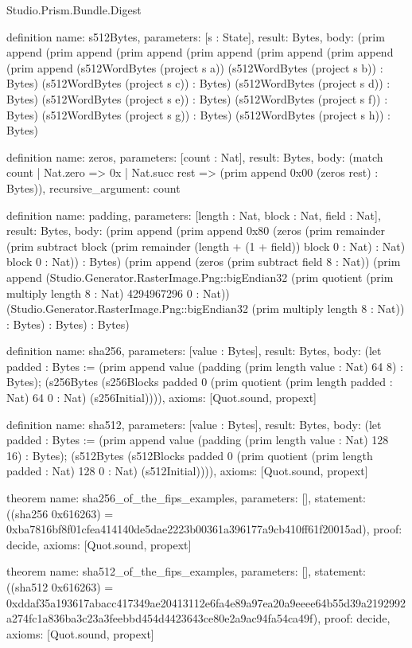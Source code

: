 \begin{lexlean}{Studio.Prism.Bundle.Digest}
\begin{semanticmodule}
definition{
  name: s512Bytes,
  parameters: [s : State],
  result: Bytes,
  body: (prim append (prim append (prim append (prim append (prim append (prim append (prim append (s512WordBytes (project s a)) (s512WordBytes (project s b)) : Bytes) (s512WordBytes (project s c)) : Bytes) (s512WordBytes (project s d)) : Bytes) (s512WordBytes (project s e)) : Bytes) (s512WordBytes (project s f)) : Bytes) (s512WordBytes (project s g)) : Bytes) (s512WordBytes (project s h)) : Bytes)
}

definition{
  name: zeros,
  parameters: [count : Nat],
  result: Bytes,
  body: (match count
    | Nat.zero => 0x
    | Nat.succ rest => (prim append 0x00 (zeros rest) : Bytes)),
  recursive_argument: count
}

definition{
  name: padding,
  parameters: [length : Nat, block : Nat, field : Nat],
  result: Bytes,
  body: (prim append (prim append 0x80 (zeros (prim remainder (prim subtract block (prim remainder (length + (1 + field)) block 0 : Nat) : Nat) block 0 : Nat)) : Bytes) (prim append (zeros (prim subtract field 8 : Nat)) (prim append (Studio.Generator.RasterImage.Png::bigEndian32 (prim quotient (prim multiply length 8 : Nat) 4294967296 0 : Nat)) (Studio.Generator.RasterImage.Png::bigEndian32 (prim multiply length 8 : Nat)) : Bytes) : Bytes) : Bytes)
}

definition{
  name: sha256,
  parameters: [value : Bytes],
  result: Bytes,
  body: (let padded : Bytes := (prim append value (padding (prim length value : Nat) 64 8) : Bytes); (s256Bytes (s256Blocks padded 0 (prim quotient (prim length padded : Nat) 64 0 : Nat) (s256Initial)))),
  axioms: [Quot.sound, propext]
}

definition{
  name: sha512,
  parameters: [value : Bytes],
  result: Bytes,
  body: (let padded : Bytes := (prim append value (padding (prim length value : Nat) 128 16) : Bytes); (s512Bytes (s512Blocks padded 0 (prim quotient (prim length padded : Nat) 128 0 : Nat) (s512Initial)))),
  axioms: [Quot.sound, propext]
}

theorem{
  name: sha256_of_the_fips_examples,
  parameters: [],
  statement: ((sha256 0x616263) = 0xba7816bf8f01cfea414140de5dae2223b00361a396177a9cb410ff61f20015ad),
  proof: decide{},
  axioms: [Quot.sound, propext]
}

theorem{
  name: sha512_of_the_fips_examples,
  parameters: [],
  statement: ((sha512 0x616263) = 0xddaf35a193617abacc417349ae20413112e6fa4e89a97ea20a9eeee64b55d39a2192992a274fc1a836ba3c23a3feebbd454d4423643ce80e2a9ac94fa54ca49f),
  proof: decide{},
  axioms: [Quot.sound, propext]
}

\end{semanticmodule}
\end{lexlean}
